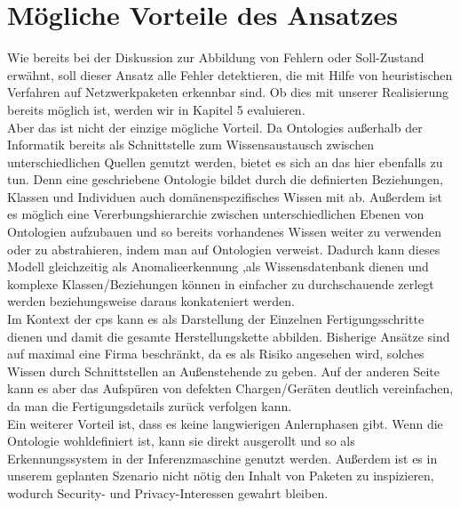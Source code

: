 \section{\nohyphens{Mögliche Vorteile des Ansatzes}}
\label{chap:2:advantages}
Wie bereits bei der Diskussion zur Abbildung von Fehlern oder Soll-Zustand erwähnt, soll dieser Ansatz alle Fehler detektieren, die mit Hilfe von heuristischen Verfahren auf Netzwerkpaketen erkennbar sind. Ob dies mit unserer Realisierung bereits möglich ist, werden wir in Kapitel 5 evaluieren.\\
Aber das ist nicht der einzige mögliche Vorteil. Da \Glspl{Ontologie} außerhalb der Informatik bereits als Schnittstelle zum Wissensaustausch zwischen unterschiedlichen Quellen genutzt werden, bietet es sich an das hier ebenfalls zu tun. Denn eine geschriebene Ontologie bildet durch die definierten Beziehungen, Klassen und Individuen auch domänenspezifisches Wissen mit ab. Außerdem ist es möglich eine Vererbungshierarchie zwischen unterschiedlichen Ebenen von Ontologien aufzubauen und so bereits vorhandenes Wissen weiter zu verwenden oder zu abstrahieren, indem man auf Ontologien verweist. Dadurch kann dieses Modell gleichzeitig als Anomalieerkennung ,als Wissensdatenbank dienen und komplexe Klassen/Beziehungen können  in einfacher zu durchschauende zerlegt werden beziehungsweise daraus konkateniert werden.\\ Im Kontext der \acrlong{cps} kann es als Darstellung der Einzelnen Fertigungsschritte dienen und damit die gesamte Herstellungskette abbilden. Bisherige Ansätze sind auf maximal eine Firma beschränkt, da es als Risiko angesehen wird, solches Wissen durch Schnittstellen an Außenstehende zu geben. Auf der anderen Seite kann es aber das Aufspüren von defekten Chargen/Geräten deutlich vereinfachen, da man die Fertigungsdetails zurück verfolgen kann. \\
Ein weiterer Vorteil ist, dass es keine langwierigen Anlernphasen gibt. Wenn die Ontologie wohldefiniert ist, kann sie direkt ausgerollt und so als Erkennungssystem in der Inferenzmaschine genutzt werden. Außerdem ist es in unserem geplanten Szenario nicht nötig den Inhalt von Paketen zu inspizieren, wodurch Security- und Privacy-Interessen gewahrt bleiben.\\